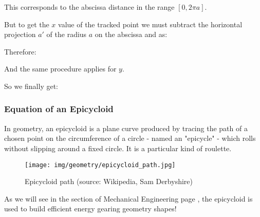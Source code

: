 	This corresponds to the abscissa distance in the range $[0,2\pi a]$.
	
	But to get the $x$  value of the tracked point we must subtract the horizontal projection $a'$ of the radius $a$ on the abscissa and as:
	
	Therefore:
	
	And the same procedure applies for $y$.

	So we finally get:
	
	
	\subsubsection{Equation of an Epicycloid}
	In geometry, an epicycloid is a plane curve produced by tracing the path of a chosen point on the circumference of a circle - named an "epicycle" - which rolls without slipping around a fixed circle. It is a particular kind of roulette.
	\begin{figure}[H]
		\centering
		\texttt{[image: img/geometry/epicycloid\_path.jpg]}
		\caption[Epicycloid path]{Epicycloid path (source: Wikipedia, Sam Derbyshire)}
	\end{figure}
	As we will see in the section of Mechanical Engineering page \pageref{epicyclic gears}, the epicycloid is used to build efficient energy gearing geometry shapes!
	
